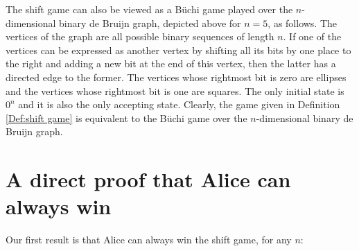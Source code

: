 \documentclass[final,12pt]{elsarticle}
\theoremstyle{definition} \newtheorem{definition}[theorem]{Definition} \newtheorem{observation}[theorem]{Observation} \newtheorem{example}[theorem]{Example} \newtheorem{remark}[theorem]{Remark} \newtheorem{corrolary}[theorem]{Corrolary}
\begin{document}
The shift game can also be viewed as a B\"uchi game played over the $n$-dimensional binary de Bruijn graph, depicted above for $n=5$, as follows. The vertices of the graph are all possible binary sequences of length $n$. If one of the vertices can be expressed as another vertex by shifting all its bits by one place to the right and adding a new bit at the end of this vertex, then the latter has a directed edge to the former. The vertices whose rightmost bit is zero are ellipses and the vertices whose rightmost bit is one are squares. The only initial state is $0^n$ and it is also the only accepting state. Clearly, the game given in Definition~   \ref{Def:shift game} is equivalent to the B\"uchi game over the $n$-dimensional binary de Bruijn graph.

\section{A direct proof that Alice can always win} 
\label{sec:alice-wins}
Our first result is that Alice can always win the shift game, for any $n$:
\end{document}
